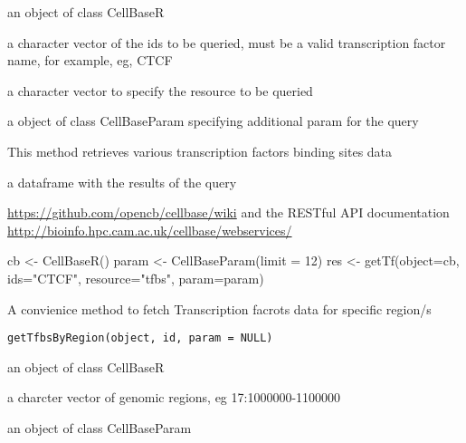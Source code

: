 \documentclass[letterpaper]{book}
\begin{document}
\begin{Arguments}
\begin{ldescription}
\item[\code{object}] an object of class CellBaseR

\item[\code{ids}] a character vector of the ids to be queried, must be a valid 
transcription factor name, for example, 
eg, CTCF

\item[\code{resource}] a character vector to specify the resource to be queried

\item[\code{param}] a object of class CellBaseParam specifying additional param
for the query
\end{ldescription}
\end{Arguments}
%
\begin{Details}\relax
This method retrieves various transcription factors binding sites 
data
\end{Details}
%
\begin{Value}
a dataframe with the results of the query
\end{Value}
%
\begin{SeeAlso}\relax
\url{https://github.com/opencb/cellbase/wiki} 
and the RESTful API documentation 
\url{http://bioinfo.hpc.cam.ac.uk/cellbase/webservices/}
\end{SeeAlso}
%
\begin{Examples}
\begin{ExampleCode}
   cb <- CellBaseR()
   param <- CellBaseParam(limit = 12)
   res <- getTf(object=cb, ids="CTCF", resource="tfbs", param=param)
\end{ExampleCode}
\end{Examples}
%
\begin{Description}\relax
A convienice method to fetch Transcription facrots data for specific region/s
\end{Description}
%
\begin{Usage}
\begin{verbatim}
getTfbsByRegion(object, id, param = NULL)
\end{verbatim}
\end{Usage}
%
\begin{Arguments}
\begin{ldescription}
\item[\code{object}] an object of class CellBaseR

\item[\code{id}] a charcter vector of genomic regions, eg 17:1000000-1100000

\item[\code{param}] an object of class CellBaseParam
\end{ldescription}
\end{Arguments}
\end{document}
